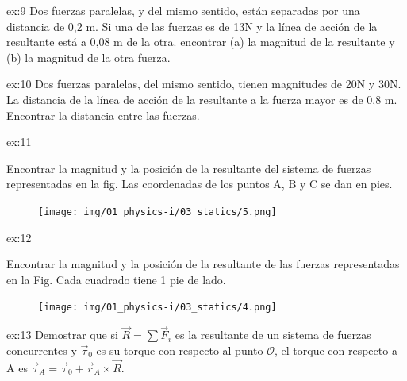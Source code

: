 \begin{multicols}{2}
     \begin{excercise}[][][$R=32.5\ \mathrm{N}$, $F_2=19.5\ \mathrm{N}$]{ex:9}{
         Dos fuerzas paralelas, y del mismo sentido, están separadas por una distancia de 0,2 m. Si una de las fuerzas es de 13N y la línea de acción de la resultante está a 0,08 m de la otra. encontrar (a) la magnitud de la resultante y (b) la magnitud de la otra fuerza.       
         }
     \end{excercise}
     \begin{excercise}[][][$d=2m$]{ex:10}{
         Dos fuerzas paralelas, del mismo sentido, tienen magnitudes de 20N y 30N. La distancia de la línea de acción de la resultante a la fuerza mayor es de 0,8 m. Encontrar la distancia entre las fuerzas.   
         }
     \end{excercise}
     \begin{excercise}[][][$R=22.2\ \mathrm{lbf}$, $y=-2.081x-3.65$]{ex:11}{
         Encontrar la magnitud y la posición de la resultante del sistema de fuerzas representadas en la fig. Las coordenadas de los puntos A, B y C se dan en pies.
         \begin{figure}[H]
             \centering
             \texttt{[image: img/01\_physics-i/03\_statics/5.png]}
         \end{figure}
         }
     \end{excercise}
     \begin{excercise}[][][$R=25.7\ \mathrm{lbf}$, $y=$]{ex:12}{
         Encontrar la magnitud y la posición de la resultante de las fuerzas representadas en la Fig.  Cada cuadrado tiene 1 pie de lado.
         \begin{figure}[H]
             \centering
             \texttt{[image: img/01\_physics-i/03\_statics/4.png]}
         \end{figure}
         }
     \end{excercise}
    \begin{excercise}[][][]{ex:13}{
            Demostrar que si $\vec{R} = \sum \vec{F}_i$ es la resultante de un sistema de fuerzas concurrentes y $\vec{\tau}_0$ es su torque con respecto al punto $\mathcal{O}$, el torque con respecto a A es $\vec{\tau}_A = \vec{\tau}_0 + \vec{r}_A \times \vec{R}$. 
         }
     \end{excercise}


\end{multicols}
